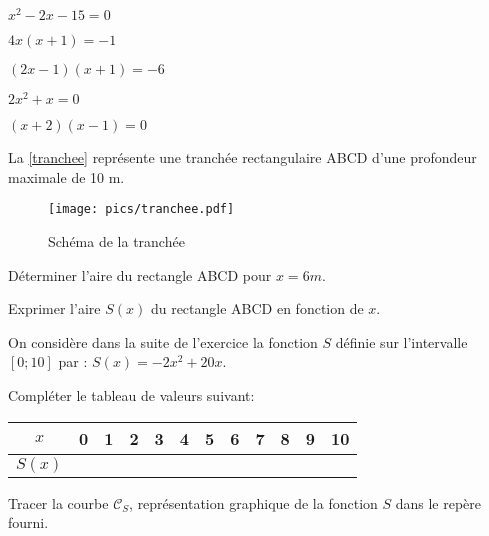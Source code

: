 \documentclass[a4paper,12pt]{scrartcl}
\begin{document}
\question{}
$x^2 - 2x -15 = 0$

\question{}
$4x (x +1) = -1$

\question{}
$(2x -1)(x + 1) = -6$

\question{}
$2x^2 + x = 0$

\question{}
$(x +2)(x -1) = 0$

\exo[2]{}
La \vref{tranchee} représente une tranchée rectangulaire ABCD d'une
profondeur maximale de 10 m.

\begin{figure}
\begin{center}
\texttt{[image: pics/tranchee.pdf]}
\end{center}
\caption{Schéma de la tranchée}
\label{tranchee}
\end{figure}

\question{}
Déterminer l’aire du rectangle ABCD pour $x = 6 m$.

\question{}
Exprimer l’aire $S(x)$ du rectangle ABCD en fonction de $x$.

On considère dans la suite de l’exercice la fonction $S$ définie sur l’intervalle $[0 ;10]$ par :
$S(x) = -2x^2 + 20x$.

\question{}
Compléter le tableau de valeurs suivant:

\begin{table}[h]
\begin{center}
\begin{tabular}{|c|c|c|c|c|c|c|c|c|c|c|c|}
\hline
$x$    & 0 & 1  & 2  & 3  & 4  & 5  & 6  & 7  & 8  & 9  & 10 \\ \hline
$S(x)$ & \hspace{0.6cm} & \hspace{0.6cm} & \hspace{0.6cm} & \hspace{0.6cm} & \hspace{0.6cm} & \hspace{0.6cm} & \hspace{0.6cm} & \hspace{0.6cm} & \hspace{0.6cm} & \hspace{0.6cm} & \hspace{0.6cm} \\ \hline
\end{tabular}
\end{center}
\end{table}

\question{}
Tracer la courbe $\mathcal{C}_S$, représentation graphique de la fonction $S$ dans le repère fourni.
\end{document}
